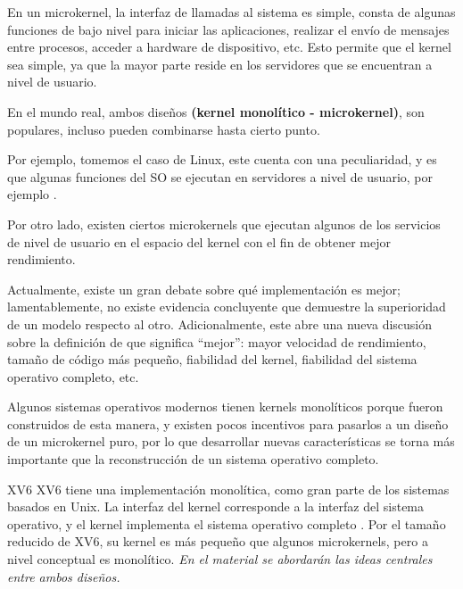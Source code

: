 \documentclass{libs/ufc_format}
\begin{document}
\begin{frame}
  En un microkernel, la interfaz de llamadas al sistema es simple, consta de algunas funciones de bajo nivel para iniciar las aplicaciones, realizar el envío de mensajes entre procesos, acceder a hardware de dispositivo, etc. Esto permite que el kernel sea simple, ya que la mayor parte reside en los servidores que se encuentran a nivel de usuario.

  \vspace{0.2cm}

  En el mundo real, ambos diseños \textbf{(kernel monolítico - microkernel)}, son populares, incluso pueden combinarse hasta cierto punto.\newline

  \vspace{0.2cm}

  Por ejemplo, tomemos el caso de Linux, este cuenta con una peculiaridad, y es que algunas funciones del SO se ejecutan en servidores a nivel de usuario, por ejemplo . \newline

  \vspace{0.2cm}

  Por otro lado, existen ciertos microkernels que ejecutan algunos de los servicios de nivel de usuario en el espacio del kernel con el fin de obtener mejor rendimiento.
\end{frame}
\begin{frame}
  Actualmente, existe un gran debate sobre qué implementación es mejor; lamentablemente, no existe evidencia concluyente que demuestre la superioridad de un modelo respecto al otro. Adicionalmente, este abre una nueva discusión sobre la definición de que significa “mejor”: mayor velocidad de rendimiento, tamaño de código más pequeño, fiabilidad del kernel, fiabilidad del sistema operativo completo, etc.

  \vspace{0.3cm}

  Algunos sistemas operativos modernos tienen kernels monolíticos porque fueron construidos de esta manera, y existen pocos incentivos para pasarlos a un diseño de un microkernel puro, por lo que desarrollar nuevas características se torna más importante que la reconstrucción de un sistema operativo completo.
\end{frame}
\begin{frame}{XV6}
  XV6 tiene una implementación monolítica, como gran parte de los sistemas basados en Unix. La interfaz del kernel corresponde a la interfaz del sistema operativo, y el kernel implementa el sistema operativo completo \cite{xv6_book}. Por el tamaño reducido de XV6, su kernel es más pequeño que algunos microkernels, pero a nivel conceptual es monolítico. \newline
  \emph{En el material se abordarán las ideas centrales entre ambos diseños.}
\end{frame}
\end{document}
